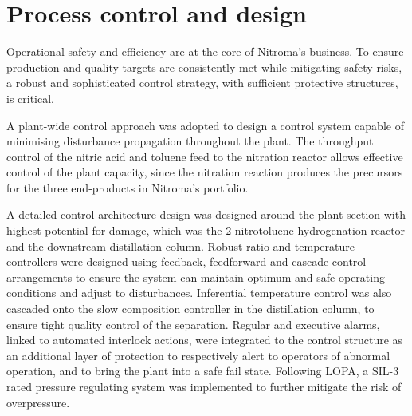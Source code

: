 \section*{Process control and design}

Operational safety and efficiency are at the core of Nitroma's business. To ensure production and quality targets are consistently met while mitigating safety risks, a robust and sophisticated control strategy, with sufficient protective structures, is critical.

A plant-wide control approach was adopted to design a control system capable of minimising disturbance propagation throughout the plant.  The throughput control of the nitric acid and toluene feed to the nitration reactor allows effective control of the plant capacity, since the nitration reaction produces the precursors for the three end-products in Nitroma's portfolio.   


A detailed control architecture design was designed around the plant section with highest potential for damage, which was the 2-nitrotoluene hydrogenation reactor and the downstream distillation column. Robust ratio and temperature controllers were designed using feedback, feedforward and cascade control arrangements to ensure the system can maintain optimum and safe operating conditions and adjust to disturbances. Inferential temperature control was also cascaded onto the slow composition controller in the distillation column, to ensure tight quality control of the separation. Regular and executive alarms, linked to automated interlock actions, were integrated to the control structure as an additional layer of protection to respectively alert to operators of abnormal operation, and to bring the plant into a safe fail state. Following LOPA, a SIL-3 rated pressure regulating system was implemented to further mitigate the risk of overpressure.




